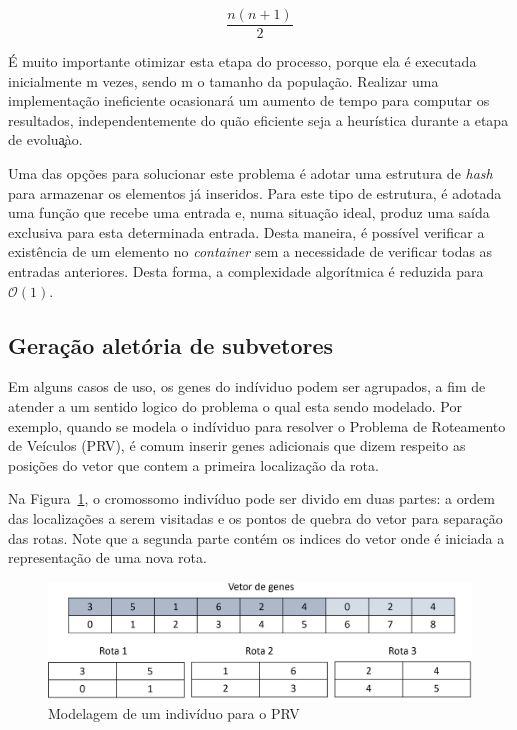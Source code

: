 \documentclass[12pt]{article}
\begin{document}
\begin{equation}
    \frac{n(n+1)}{2}
    \label{eq:numNatural}
\end{equation}

\'{E} muito importante otimizar esta etapa do processo, porque ela \'{e} executada inicialmente m vezes, sendo
m o tamanho da popula\c{c}\~{a}o. Realizar uma implementa\c{c}\~{a}o ineficiente ocasionar\'{a} um aumento de
tempo para computar os resultados, independentemente do qu\~{a}o eficiente seja a heur\'{i}stica durante a etapa
de evolu\c{a}\`{a}o.

Uma das op\c{c}\~{o}es para solucionar este problema \'{e} adotar uma estrutura de \textit{hash} para armazenar os
elementos j\'{a} inseridos. Para este tipo de estrutura, \'{e} adotada uma fun\c{c}\~{a}o que recebe uma entrada e,
numa situa\c{c}\~{a}o ideal, produz uma sa\'{i}da exclusiva para esta determinada entrada. Desta maneira, \'{e}
poss\'{i}vel verificar a exist\^{e}ncia de um elemento no \textit{container} sem a necessidade de verificar todas
as entradas anteriores. Desta forma, a complexidade algor\'{i}tmica \'{e} reduzida para $\mathcal{O}(1)$.

\subsection{Gera\c{c}\~{a}o alet\'{o}ria de subvetores}

Em alguns casos de uso, os genes do ind\'{i}viduo podem ser agrupados, a fim de atender a um sentido logico do problema
o qual esta sendo modelado. Por exemplo, quando se modela o ind\'{i}viduo para resolver o Problema de Roteamento de
Ve\'{i}culos (PRV), \'{e} comum inserir genes adicionais que dizem respeito as posi\c{c}\~{o}es do vetor que contem a primeira
localiza\c{c}\~{a}o da rota.

Na Figura~\ref{fig:vrpGenes}, o cromossomo indiv\'{i}duo pode ser divido em duas partes: a ordem das localiza\c{c}\~{o}es
a serem visitadas e os pontos de quebra do vetor para separa\c{c}\~{a}o das rotas. Note que a segunda parte cont\'{e}m os
indices do vetor onde \'{e} iniciada a representa\c{c}\~{a}o de uma nova rota.

\begin{figure}[ht]
    \centering
    \includegraphics[width=.8\textwidth]{vrp_genes.jpg}
    \caption{Modelagem de um indiv\'{i}duo para o PRV}
    \label{fig:vrpGenes}
\end{figure}
\end{document}
